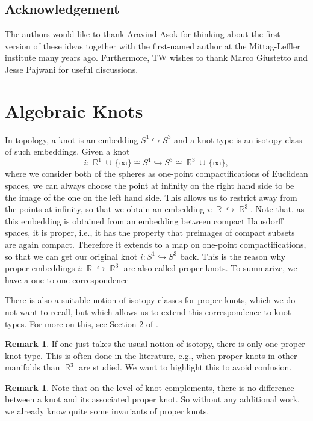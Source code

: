 \documentclass[english]{amsart}
\theoremstyle{definition}
\newtheorem{rem}[prop]{Remark}
\DeclareMathOperator{\R}{\mathbb{R}}
\begin{document}
\subsection*{Acknowledgement} The authors would like to thank Aravind Asok for thinking about the first version of these ideas together with the first-named author at the Mittag-Leffler institute many years ago. Furthermore, TW wishes to thank Marco Giustetto and Jesse Pajwani for useful discussions. 

\section{Algebraic Knots}
In topology, a knot is an embedding $S^1 \hookrightarrow S^3$ and a knot type is an isotopy class of such embeddings. Given a knot 
$$i \colon \R^1 \cup \, \lbrace \infty \rbrace \cong S^1 \hookrightarrow S^3 \cong \R^3 \cup \, \lbrace \infty \rbrace,$$
where we consider both of the spheres as one-point compactifications of Euclidean spaces, we can always choose the point at infinity on the right hand side to be the image of the one on the left hand side. This allows us to restrict away from the points at infinity, so that we obtain an embedding $i \colon \R \hookrightarrow \R^3$. Note that, as this embedding is obtained from an embedding between compact Hausdorff spaces, it is proper, i.e., it has the property that preimages of compact subsets are again compact. Therefore it extends to a map on one-point compactifications, so that we can get our original knot $i \colon S^1 \hookrightarrow S^3$ back. This is the reason why proper embeddings $i \colon \R \hookrightarrow \R^3$ are also called proper knots. To summarize, we have a one-to-one correspondence
\begin{center}
\end{center}
There is also a suitable notion of isotopy classes for proper knots, which we do not want to recall, but which allows us to extend this correspondence to knot types. For more on this, see Section 2 of \cite{MR1145717}.
\begin{rem}
If one just takes the usual notion of isotopy, there is only one proper knot type. This is often done in the literature, e.g., when proper knots in other manifolds than $\R^3$ are studied. We want to highlight this to avoid confusion.
\end{rem}
\begin{rem}
Note that on the level of knot complements, there is no difference between a knot and its associated proper knot. So without any additional work, we already know quite some invariants of proper knots.
\end{rem}
\end{document}
